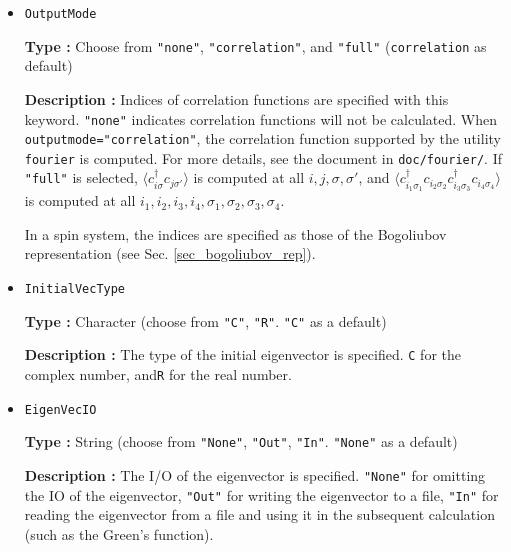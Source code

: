 \begin{itemize}
{\bf Type :} Positive integer (default value: \verb|20|)

{\bf Description :} (Only for TPQ) 
The interval of calculating correlation functions in the TPQ iteration is specified.\\ 
{\bf Note:} A small interval increases the time cost of calculations.

\item \verb|OutputMode|

{\bf Type :} Choose from \verb|"none"|, \verb|"correlation"|, and \verb|"full"|
(\verb|correlation| as default)

{\bf Description :} Indices of correlation functions
are specified with this keyword.
\verb|"none"| indicates correlation functions will not be calculated.
When \verb|outputmode="correlation"|,
the correlation function supported by the utility \verb|fourier| is computed.
For more details, see the document in \verb|doc/fourier/|.
If \verb|"full"| is selected,
$\langle c_{i \sigma}^{\dagger}c_{j \sigma'} \rangle$ is computed at all $i, j, \sigma, \sigma'$,
and
$\langle c_{i_1 \sigma_1}^{\dagger}c_{i_2 \sigma_2} c_{i_3 \sigma_3}^{\dagger}c_{i_4 \sigma_4} \rangle$
is computed at all $i_1, i_2, i_3, i_4, \sigma_1, \sigma_2, \sigma_3, \sigma_4$.

In a spin system, 
the indices are specified as those of the Bogoliubov representation
(see Sec. \ref{sec_bogoliubov_rep}).

\item \verb|InitialVecType|

  {\bf Type :} Character (choose from \verb|"C"|, \verb|"R"|.
  \verb|"C"| as a default)

  {\bf Description :} The type of the initial eigenvector is specified.
  \verb|C| for the complex number, and\verb|R| for the real number.

\item \verb|EigenVecIO|
  
  {\bf Type :} String (choose from \verb|"None"|, \verb|"Out"|, \verb|"In"|.
  \verb|"None"| as a default)

  {\bf Description :} The I/O of the eigenvector is specified.
  \verb|"None"| for omitting the IO of the eigenvector,
  \verb|"Out"| for writing the eigenvector to a file,
  \verb|"In"| for reading the eigenvector from a file and
  using it in the subsequent calculation (such as the Green's function).

\end{itemize}

